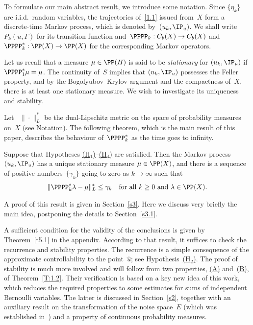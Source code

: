 To formulate our main abstract result, we introduce some notation. Since $\{\eta_k\}$ are i.i.d.\ random variables, the trajectories of~\eqref{1.1} issued from~$X$ form a discrete-time Markov process, which is denoted by~$(u_k,\IP_u)$. We shall write $P_k(u,\Gamma)$ for its transition function and~$\PPPP_k:C_b(X)\to C_b(X)$ and $\PPPP_k^*:\PP(X)\to\PP(X)$ for the corresponding Markov operators.

Let us recall that a measure $\mu \in \PP(H)$ is said to be \emph{stationary} for $(u_k,\IP_u)$ if~$\PPPP^*_1\mu=\nobreak\mu$. The continuity of~$S$ implies that $(u_k,\IP_u)$ possesses the Feller property, and by the Bogolyubov--Krylov argument and the compactness of~$X$, there is at least one stationary measure. We wish to investigate its uniqueness and stability.

Let ~$\|\cdot\|_L^*$ be the dual-Lipschitz metric on the space of probability measures on~$X$ (see Notation). The following theorem, which is the main result of this paper, describes the behaviour of~$\PPPP_k^*$ as the time goes to infinity.

\begin{theorem} \label{t1.1}
Suppose that Hypotheses \hyperlink{H1}{\rm(H$_1$)}--\hyperlink{H4}{\rm(H$_4$)} are satisfied. Then the Markov process $(u_k,\IP_u)$ has a unique stationary measure $\mu\in \PP(X)$, and there is a sequence of positive numbers~$\{\gamma_k\}$ going to zero as $k\to\infty$ such that
\begin{equation} \label{1.6}
\|\PPPP_k^*\lambda-\mu\|_L^*\le \gamma_k\quad\text{for all $k\ge0$ and $\lambda\in\PP(X)$}.
\end{equation}
\end{theorem}
A proof of this result is given in Section~\ref{s3}. Here we discuss very briefly the main idea, postponing the details to Section~\ref{s3.1}.

A sufficient condition for the validity of the conclusions is given by Theorem~\ref{t5.1} in the appendix. According to that result, it suffices to check the recurrence and stability properties. The recurrence is a simple consequence of the approximate controllability to the point~$\hat u$; see Hypothesis~\hyperlink{H2}{(H$_2$)}. The proof of stability is much more involved and will follow from two properties, \hyperlink{(A)}{(A)} and~\hyperlink{(B)}{(B)}, of Theorem~\ref{T:1.2}. Their verification is based on a key new idea of this work, which reduces the required properties to some estimates for sums of independent Bernoulli variables. The latter is discussed in Section~\ref{s2}, together with an auxiliary result on the transformation of the noise space~$E$ (which was established in~\cite{KNS-2020}) and a property of continuous probability measures.

